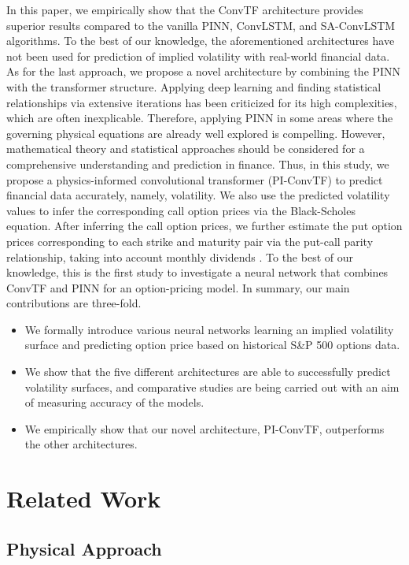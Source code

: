 \documentclass{article}
\begin{document}
In this paper, we empirically show that the ConvTF architecture provides superior results compared to the vanilla PINN, ConvLSTM, and SA-ConvLSTM algorithms.
To the best of our knowledge, the aforementioned architectures have not been used for prediction of implied volatility with real-world financial data.
As for the last approach, we propose a novel architecture by combining the PINN with the transformer structure.
Applying deep learning and finding statistical relationships via extensive iterations has been criticized for its high complexities, which are often inexplicable. 
Therefore, applying PINN in some areas where the governing physical equations are already well explored is compelling. 
However, mathematical theory and statistical approaches should be considered for a comprehensive understanding and prediction in finance. 
Thus, in this study, we propose a physics-informed convolutional transformer (PI-ConvTF) to predict financial data accurately, namely, volatility. 
We also use the predicted volatility values to infer the corresponding call option prices via the Black-Scholes equation. 
After inferring the call option prices, we further estimate the put option prices corresponding to each strike and maturity pair via the put-call parity relationship, taking into account monthly dividends \citep{hull2003textbook}.
To the best of our knowledge, this is the first study to investigate a neural network that combines ConvTF and PINN for an option-pricing model.
In summary, our main contributions are three-fold.

\begin{itemize}
    \item We formally introduce various neural networks learning an implied volatility surface and predicting option price based on historical S\&P 500 options data.
	\item We show that the five different architectures are able to successfully predict volatility surfaces, and comparative studies are being carried out with an aim of measuring accuracy of the models. 
	\item We empirically show that our novel architecture, PI-ConvTF, outperforms the other architectures. 
\end{itemize}

\section{Related Work}
\label{sec:headings}

\subsection{Physical Approach}
\end{document}
